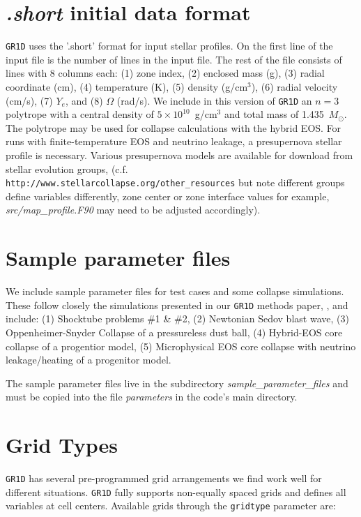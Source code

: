 \documentclass[10pt,nofootinbib]{article}
\newcommand{\code}[1]{\texttt{#1}}
\begin{document}
\section{{\it.short} initial data format}
\code{GR1D} uses the '.short' format for input stellar profiles. On
the first line of the input file is the number of lines in the input
file.  The rest of the file consists of lines with 8 columns each: (1)
zone index, (2) enclosed mass (g), (3) radial coordinate (cm), (4)
temperature (K), (5) density (g/cm$^3$), (6) radial velocity (cm/s),
(7) $Y_e$, and (8) $\Omega$ (rad/s). We include in this version of
\code{GR1D} an $n=3$ polytrope with a central density of
$5\times10^{10}$~g/cm$^3$ and total mass of 1.435~$M_\odot$. The
polytrope may be used for collapse calculations with the hybrid
EOS. For runs with finite-temperature EOS and neutrino leakage, a
presupernova stellar profile is necessary.  Various presupernova
models are available for download from stellar evolution groups,
(c.f. {\tt http://www.stellarcollapse.org/other\_resources} but note
different groups define variables differently, zone center or zone
interface values for example, {\emph{src/map\_profile.F90}} may need to
be adjusted accordingly).

\section{Sample parameter files}
We include sample parameter files for test cases and some collapse
simulations.  These follow closely the simulations presented in our
\code{GR1D} methods paper, \cite{oconnor:10}, and include: (1)
Shocktube problems \#1 \& \#2, (2) Newtonian Sedov blast wave, (3)
Oppenheimer-Snyder Collapse of a pressureless dust ball, (4)
Hybrid-EOS core collapse of a progentior model, (5) Microphysical EOS
core collapse with neutrino leakage/heating of a progenitor model.

The sample parameter files live in the subdirectory 
\emph{sample\_parameter\_files} and must be copied into the
file \emph{parameters} in the code's main directory. 

\section{Grid Types}
\label{sec:gridtypes}
\code{GR1D} has several pre-programmed grid arrangements we find work
well for different situations.  \code{GR1D} fully supports non-equally
spaced grids and defines all variables at cell centers.  Available
grids through the {\tt gridtype} parameter are:
\end{document}
